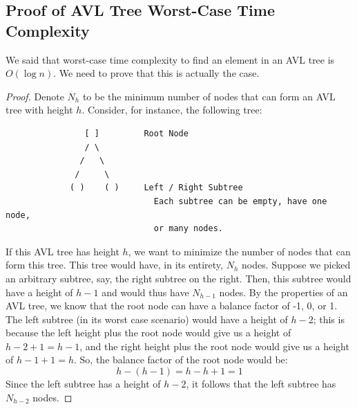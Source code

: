 \documentclass[letterpaper]{article}
\begin{document}
\subsection{Proof of AVL Tree Worst-Case Time Complexity}
We said that worst-case time complexity to find an element in an AVL tree is $O(\log n)$. We need to prove that this is actually the case. 

\begin{mdframed}
    \begin{proof}
        Denote $N_h$ to be the minimum number of nodes that can form an AVL tree with height $h$. Consider, for instance, the following tree: 
    \begin{verbatim}
                [ ]         Root Node 
                / \          
               /   \ 
              /     \ 
             ( )    ( )     Left / Right Subtree 
                              Each subtree can be empty, have one node, 
                              or many nodes. 
    \end{verbatim}
    If this AVL tree has height $h$, we want to minimize the number of nodes that can form this tree. This tree would have, in its entirety, $N_h$ nodes. Suppose we picked an arbitrary subtree, say, the right subtree on the right. Then, this subtree would have a height of $h - 1$ and would thus have $N_{h - 1}$ nodes. By the properties of an AVL tree, we know that the root node can have a balance factor of -1, 0, or 1. The left subtree (in its worst case scenario) would have a height of $h - 2$; this is because the left height plus the root node would give us a height of $h - 2 + 1 = h - 1$, and the right height plus the root node would give us a height of $h - 1 + 1 = h$. So, the balance factor of the root node would be: 
    \[h - (h - 1) = h - h + 1 = 1\]
    Since the left subtree has a height of $h - 2$, it follows that the left subtree has $N_{h - 2}$ nodes. 

    \bigskip 


\end{proof}
\end{mdframed}
\end{document}
